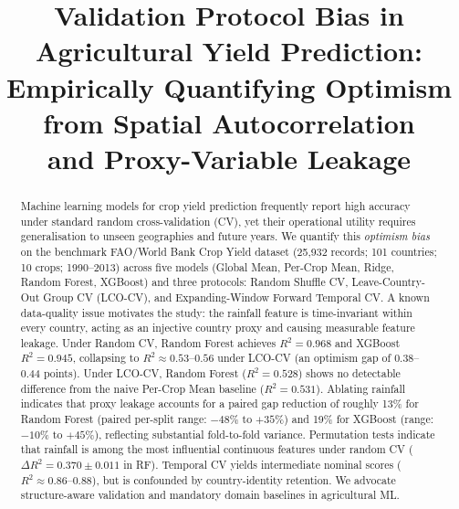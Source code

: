\documentclass[conference]{IEEEtran}
\begin{document}
\title{Validation Protocol Bias in Agricultural Yield Prediction:\\
Empirically Quantifying Optimism from Spatial Autocorrelation\\
and Proxy-Variable Leakage}

\author{
}

\maketitle

\begin{abstract}
Machine learning models for crop yield prediction frequently report high 
accuracy under standard random cross-validation (CV), yet their operational 
utility requires generalisation to unseen geographies and future years. 
We quantify this \emph{optimism bias} on the benchmark FAO/World Bank Crop 
Yield dataset (25{,}932 records; 101 countries; 10 crops; 1990--2013) across 
five models (Global Mean, Per-Crop Mean, Ridge, Random Forest, XGBoost) and three 
protocols: Random Shuffle CV, Leave-Country-Out Group CV (LCO-CV), and 
Expanding-Window Forward Temporal CV. A known data-quality issue motivates 
the study: the rainfall feature is time-invariant within every country, 
acting as an injective country proxy and causing measurable feature leakage. 
Under Random CV, Random Forest achieves $R^2 = 0.968$ and XGBoost $R^2 = 0.945$, 
collapsing to $R^2 \approx 0.53$--$0.56$ under LCO-CV (an optimism gap 
of 0.38--0.44 points). Under LCO-CV, Random Forest ($R^2 = 0.528$) shows 
no detectable difference from the naive Per-Crop Mean baseline ($R^2 = 0.531$). 
Ablating rainfall indicates that proxy leakage accounts for a paired gap 
reduction of roughly 13\% for Random Forest (paired per-split range: $-48\%$ to 
$+35\%$) and 19\% for XGBoost (range: $-10\%$ to $+45\%$), reflecting substantial 
fold-to-fold variance. Permutation tests indicate that rainfall is among the most 
influential continuous features under random CV ($\Delta R^2 = 0.370 \pm 0.011$ in RF). 
Temporal CV yields intermediate nominal scores ($R^2 \approx 0.86$--$0.88$), but 
is confounded by country-identity retention. We advocate structure-aware validation 
and mandatory domain baselines in agricultural ML.
\end{abstract}
\end{document}
